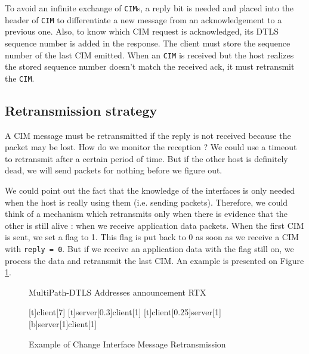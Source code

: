 To avoid an infinite exchange of \texttt{CIM}s, a reply bit is needed and placed into the header of \texttt{CIM} to differentiate a new message from an acknowledgement to a previous one. Also, to know which CIM request is acknowledged, its DTLS sequence number is added in the response. The client must store the sequence number of the last CIM emitted. When an \texttt{CIM} is received but the host realizes the stored sequence number doesn't match the received ack, it must retransmit the \texttt{CIM}.

\subsection{Retransmission strategy}

A CIM message must be retransmitted if the reply is not received because the packet may be lost. How do we monitor the reception ? We could use a timeout to retransmit after a certain period of time. But if the other host is definitely dead, we will send packets for nothing before we figure out.

We could point out the fact that the knowledge of the interfaces is only needed when the host is really using them (i.e. sending packets). Therefore, we could think of a mechanism which retransmits only when there is evidence that the other is still alive : when we receive application data packets. When the first CIM is sent, we set a flag to 1. This flag is put back to 0 as soon as we receive a CIM with \verb$reply = 0$. But if we receive an application data with the flag still on, we process the data and retransmit the last CIM. An example is presented on Figure \ref{fig:CIMexchange2}.

\begin{figure}[!ht]
\centering
\begin{msc}[r]{MultiPath-DTLS Addresses announcement RTX}

\setlength{\instfootheight}{0em}
\setlength{\instheadheight}{0em}
\setlength{\instdist}{0.7\linewidth}
\setlength{\levelheight}{3em}


[t]{}{client}[7]
\nextlevel
{}[t]{server}[0.3]{client}[1]
\nextlevel
{}[t]{client}[0.25]{server}[1]
\nextlevel
{}[b]{server}[1]{client}[1]
\nextlevel
\nextlevel

\end{msc}
\caption{Example of Change Interface Message Retransmission}
\label{fig:CIMexchange2}
\end{figure}

